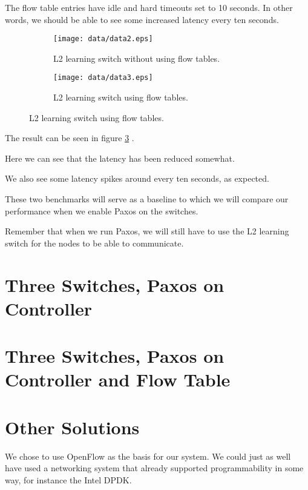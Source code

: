The flow table entries have idle and hard timeouts set to 10 seconds.
In other words, we should be able to see some increased latency every ten
seconds.

\begin{figure}
  \centering
  \begin{subfigure}{\textwidth}
    \centering
    \texttt{[image: data/data2.eps]}
    \caption{L2 learning switch without using flow tables.}
    \label{benchmark:l2.learning.switch.no.flows}
  \end{subfigure}

  \centering
  \begin{subfigure}{\textwidth}
    \centering
    \texttt{[image: data/data3.eps]}
    \caption{L2 learning switch using flow tables.}
    \label{benchmark:l2.learning.switch.with.flows}
  \end{subfigure}
\end{figure}

The result can be seen in figure \ref{benchmark:l2.learning.switch.with.flows}
.

Here we can see that the latency has been reduced somewhat.

We also see some latency spikes around every ten seconds, as expected.


These two benchmarks will serve as a baseline to which we will compare our
performance when we enable Paxos on the switches.

Remember that when we run Paxos, we will still have to use the L2 learning
switch for the nodes to be able to communicate.


\section{Three Switches, Paxos on Controller}


\section{Three Switches, Paxos on Controller and Flow Table}


\section{Other Solutions}

We chose to use OpenFlow as the basis for our system.
We could just as well have used a networking system that already supported
programmability in some way, for instance the Intel DPDK.

